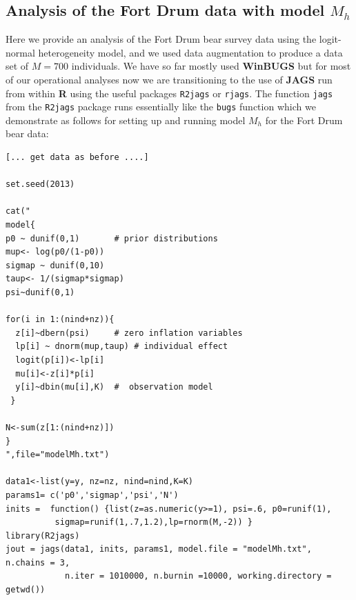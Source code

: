 \subsection{Analysis of the Fort Drum data with model $M_{h}$}
\label{closed.sec.Mhbear}

Here we provide an analysis of the Fort Drum bear survey data using
the  
 logit-normal heterogeneity model, and we 
used data augmentation to produce a data
set of $M=700$ individuals.  
We have so far mostly used 
{\bf
  WinBUGS} but for most of our operational analyses now we are
transitioning to the use of {\bf JAGS} run from within {\bf R} using the useful packages 
 \mbox{\tt R2jags} or \mbox{\tt rjags}.  The function \mbox{\tt jags}
 from the \mbox{\tt R2jags} package runs essentially like the
 \mbox{\tt bugs} function
which we demonstrate 
as follows for setting
 up and running model $M_{h}$ for the Fort Drum bear data:
{\small
\begin{verbatim}
[... get data as before ....]

set.seed(2013)

cat("
model{
p0 ~ dunif(0,1)       # prior distributions
mup<- log(p0/(1-p0))
sigmap ~ dunif(0,10)
taup<- 1/(sigmap*sigmap)
psi~dunif(0,1)

for(i in 1:(nind+nz)){
  z[i]~dbern(psi)     # zero inflation variables
  lp[i] ~ dnorm(mup,taup) # individual effect
  logit(p[i])<-lp[i]
  mu[i]<-z[i]*p[i]
  y[i]~dbin(mu[i],K)  #  observation model
 }

N<-sum(z[1:(nind+nz)])
}
",file="modelMh.txt")

data1<-list(y=y, nz=nz, nind=nind,K=K)
params1= c('p0','sigmap','psi','N')
inits =  function() {list(z=as.numeric(y>=1), psi=.6, p0=runif(1),
          sigmap=runif(1,.7,1.2),lp=rnorm(M,-2)) }
library(R2jags)
jout = jags(data1, inits, params1, model.file = "modelMh.txt", n.chains = 3, 
            n.iter = 1010000, n.burnin =10000, working.directory = getwd())
\end{verbatim}
}

